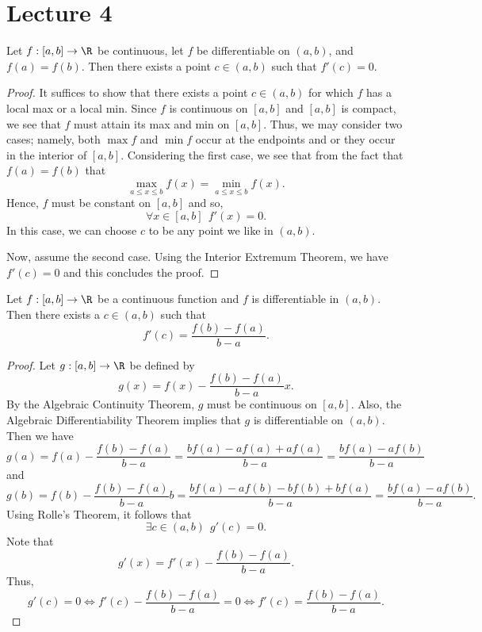 \section{Lecture 4}

\begin{theorem}\label{Rolle's Theorem}
    Let \( f: [a,b] \to \R  \) be continuous, let \( f  \) be differentiable on \( (a,b) \), and \( f(a) = f(b) \). Then there exists a point \( c \in (a,b) \) such that \( f'(c) = 0  \). 
\end{theorem}

\begin{proof}
    It suffices to show that there exists a point \( c \in (a,b)  \) for which \( f  \) has a local max or a local min. Since \( f  \) is continuous on \( [a,b] \) and \( [a,b]  \) is compact, we see that \( f  \) must attain its max and min on \( [a,b] \). Thus, we may consider two cases; namely, both \( \max f  \) and \( \min f  \) occur at the endpoints and or they occur in the interior of \( [a,b] \). Considering the first case, we see that from the fact that \( f(a) = f(b) \) that   
    \[  \max_{a \leq x \leq b } f(x) = \min_{a \leq x \leq b } f(x). \]
    Hence, \( f \) must be constant on \( [a,b] \) and so, 
    \[  \forall  x \in [a,b] \ \ f'(x) = 0.  \]
    In this case, we can choose \( c  \) to be any point we like in \( (a,b) \).  

    Now, assume the second case. Using the Interior Extremum Theorem, we have \( f'(c) = 0  \) and this concludes the proof.  
\end{proof}

\begin{theorem}\label{Mean Value Theorem}
    Let \( f: [a,b] \to \R  \) be a continuous function and \( f  \) is differentiable in \( (a,b) \). Then there exists a \( c \in (a,b)  \) such that 
    \[  f'(c) = \frac{ f(b) - f(a) }{  b - a  }. \]
\end{theorem}
\begin{proof}
    Let \( g:[a,b] \to \R  \) be defined by
    \[  g(x) = f(x) - \frac{ f(b) - f(a)  }{  b - a  }  x.  \]
    By the Algebraic Continuity Theorem, \( g  \) must be continuous on \( [a,b] \). Also, the Algebraic Differentiability Theorem implies that \( g  \) is differentiable on \( (a,b) \). Then we have  
    \[  g(a) = f(a) - \frac{ f(b) - f(a) }{  b -a  } = \frac{ b f(a) - a f(a) + a f(a)  }{  b - a  }  = \frac{ bf(a) - a f(b)  }{  b - a  }  \]
    and 
    \[  g(b) = f(b) - \frac{ f(b) - f(a) }{ b - a  } b = \frac{ b f(a) - a f(b) - b f(b) + b f(a) }{  b -a   }  = \frac{ b f(a) - a f(b)  }{  b -a  }. \]
    Using Rolle's Theorem, it follows that 
    \[  \exists c \in (a,b) \ \ g'(c) = 0.  \]
    Note that 
    \[  g'(x) = f'(x) - \frac{ f(b) - f(a) }{ b - a  }. \]
    Thus, 
    \[  g'(c) = 0  \iff f'(c) - \frac{ f(b) - f(a) }{  b -a  }  = 0  \iff f'(c) = \frac{ f(b) -f(a)  }{ b - a  }. \]
\end{proof}  

